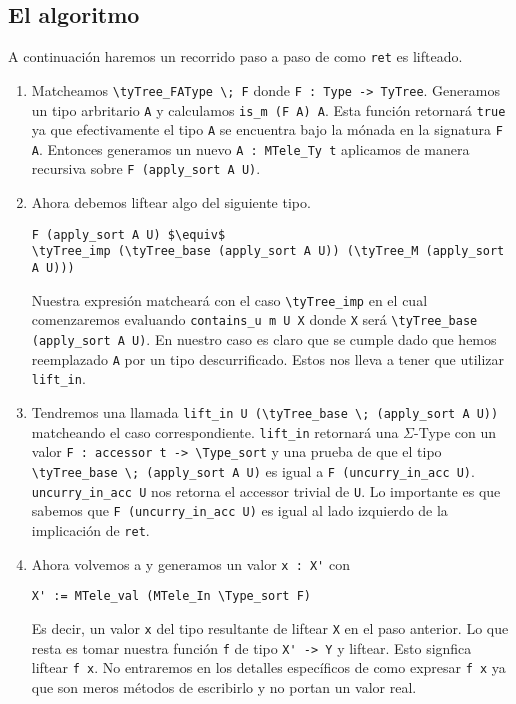 \subsection{El algoritmo}

A continuación haremos un recorrido paso a paso de como \lstinline{ret} es lifteado.

\begin{enumerate}
    \item Matcheamos \lstinline{\tyTree_FAType \; F} donde \lstinline{F : Type -> TyTree}. Generamos un tipo arbritario \lstinline{A} y calculamos \lstinline{is_m (F A) A}. Esta función retornará \lstinline{true} ya que efectivamente el tipo \lstinline{A} se encuentra bajo la mónada en la signatura \lstinline{F A}. Entonces generamos un nuevo \lstinline{A : MTele_Ty t} aplicamos \lift de manera recursiva sobre \lstinline{F (apply_sort A U)}.
    \item Ahora debemos liftear algo del siguiente tipo.
    \begin{lstlisting}
F (apply_sort A U) $\equiv$
\tyTree_imp (\tyTree_base (apply_sort A U)) (\tyTree_M (apply_sort A U)))
    \end{lstlisting}
    Nuestra expresión matcheará con el caso \lstinline{\tyTree_imp} en el cual comenzaremos evaluando \lstinline{contains_u m U X} donde \lstinline{X} será \lstinline{\tyTree_base (apply_sort A U)}. En nuestro caso es claro que se cumple dado que hemos reemplazado \lstinline{A} por un tipo descurrificado. Estos nos lleva a tener que utilizar \lstinline{lift_in}.
    \item Tendremos una llamada \lstinline{lift_in U (\tyTree_base \; (apply_sort A U))} matcheando el caso correspondiente.
    \lstinline{lift_in} retornará una $\Sigma$-Type con un valor \lstinline{F : accessor t -> \Type_sort} y una prueba de que el tipo \lstinline{\tyTree_base \; (apply_sort A U)} es igual a \lstinline{F (uncurry_in_acc U)}. \lstinline{uncurry_in_acc U} nos retorna el accessor trivial de \lstinline{U}. Lo importante es que sabemos que \lstinline{F (uncurry_in_acc U)} es igual al lado izquierdo de la implicación de \lstinline{ret}.
    \item Ahora volvemos a \lift{} y generamos un valor \lstinline{x : X'} con
    \begin{lstlisting}
X' := MTele_val (MTele_In \Type_sort F)
    \end{lstlisting}
    Es decir, un valor \lstinline{x} del tipo resultante de liftear \lstinline{X} en el paso anterior. Lo que resta es tomar nuestra función \lstinline{f} de tipo \lstinline{X' -> Y} y liftear. Esto signfica liftear \lstinline{f x}. No entraremos en los detalles específicos de como expresar \lstinline{f x} ya que son meros métodos de escribirlo y no portan un valor real.

\end{enumerate}
